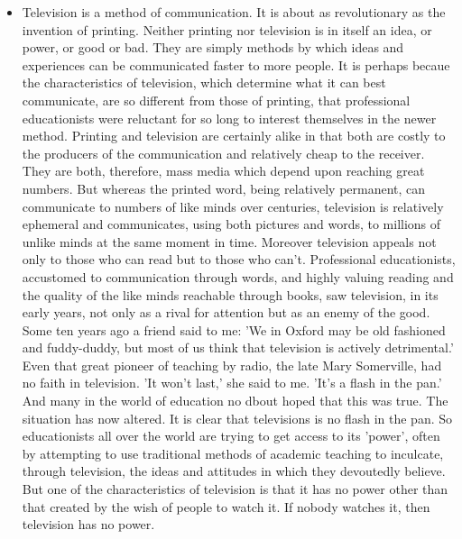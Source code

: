 \begin{itemize}
\item Television is a method of communication. It is about as revolutionary as the invention of printing. Neither printing nor television is in itself an idea, or power, or good or bad. They are simply methods by which ideas and experiences can be communicated faster to more people. It is perhaps becaue the characteristics of television, which determine what it can best communicate, are so different from those of printing, that professional educationists were reluctant for so long to interest themselves in the newer method.
Printing and television are certainly alike in that both are costly to the producers of the communication and relatively cheap to the receiver. They are both, therefore, mass media which depend upon reaching great numbers. But whereas the printed word, being relatively permanent, can communicate to numbers of like minds over centuries, television is relatively ephemeral and communicates, using both pictures and words, to millions of unlike minds at the same moment in time. Moreover television appeals not only to those who can read but to those who can't. Professional educationists, accustomed to communication through words, and highly valuing reading and the quality of the like minds reachable through books, saw television, in its early years, not only as a rival for attention but as an enemy of the good. Some ten years ago a friend said to me: 'We in Oxford may be old fashioned and fuddy-duddy, but most of us think that television is actively detrimental.' Even that great pioneer of teaching by radio, the late Mary Somerville, had no faith in television. 'It won't last,' she said to me. 'It's a flash in the pan.' And many in the world of education no dbout hoped that this was true. 
The situation has now altered. It is clear that televisions is no flash in the pan. So educationists all over the world are trying to get access to its 'power', often by attempting to use traditional methods of academic teaching to inculcate, through television, the ideas and attitudes in which they devoutedly believe. But one of the characteristics of television is that it has no power other than that created by the wish of people to watch it. If nobody watches it, then television has no power.
\end{itemize}
